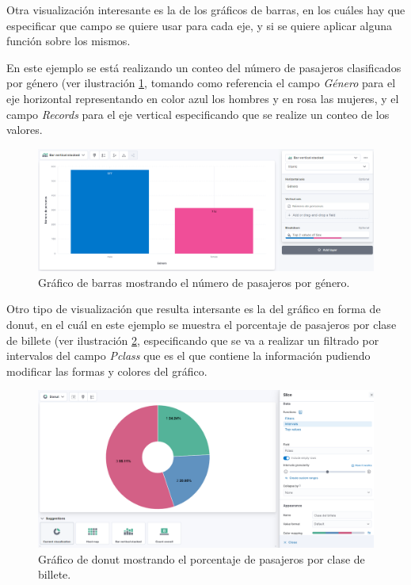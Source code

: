 Otra visualización interesante es la de los gráficos de barras, en los cuáles hay que especificar que campo se quiere usar para cada eje, y si se quiere aplicar alguna función sobre los mismos.

En este ejemplo se está realizando un conteo del número de pasajeros clasificados por género (ver ilustración  \ref{fig:kibana14}, tomando como referencia el campo \textit{Género} para el eje horizontal representando en color azul los hombres y en rosa las mujeres, y el campo \textit{Records} para el eje vertical especificando que se realize un conteo de los valores.

\begin{figure}
    \centering
    \includegraphics[width=1\linewidth]{img/kibana14.png}
    \caption{Gráfico de barras mostrando el número de pasajeros por género.}
    \label{fig:kibana14}
\end{figure}

Otro tipo de visualización que resulta intersante es la del gráfico en forma de donut, en el cuál en este ejemplo se muestra el porcentaje de pasajeros por clase de billete (ver ilustración \ref{fig:kibana15}, especificando que se va a realizar un filtrado por intervalos del campo \textit{Pclass} que es el que contiene la información pudiendo modificar las formas y colores del gráfico.

\begin{figure}
    \centering
    \includegraphics[width=1\linewidth]{img/kibana15.png}
    \caption{Gráfico de donut mostrando el porcentaje de pasajeros por clase de billete.}
    \label{fig:kibana15}
\end{figure}

